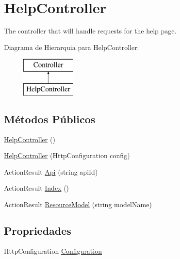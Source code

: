 \hypertarget{classApi3Layers_1_1Areas_1_1HelpPage_1_1Controllers_1_1HelpController}{}\section{Help\+Controller}
\label{classApi3Layers_1_1Areas_1_1HelpPage_1_1Controllers_1_1HelpController}


The controller that will handle requests for the help page.  


Diagrama de Hierarquia para Help\+Controller\+:\begin{figure}[H]
\begin{center}
\leavevmode
\includegraphics[height=2.000000cm]{classApi3Layers_1_1Areas_1_1HelpPage_1_1Controllers_1_1HelpController}
\end{center}
\end{figure}
\subsection*{Métodos Públicos}
\begin{DoxyCompactItemize}
\item 
\hyperlink{classApi3Layers_1_1Areas_1_1HelpPage_1_1Controllers_1_1HelpController_a83181268f5f82b22c63b3f978fa4c32c}{Help\+Controller} ()
\item 
\hyperlink{classApi3Layers_1_1Areas_1_1HelpPage_1_1Controllers_1_1HelpController_a7fb80807bac7887eefc2cf102ad34d7a}{Help\+Controller} (Http\+Configuration config)
\item 
Action\+Result \hyperlink{classApi3Layers_1_1Areas_1_1HelpPage_1_1Controllers_1_1HelpController_a7ab3cc2e28440430c53c8651bee60e72}{Api} (string api\+Id)
\item 
Action\+Result \hyperlink{classApi3Layers_1_1Areas_1_1HelpPage_1_1Controllers_1_1HelpController_a82bdd581a9c68d02c11ac8160aa5d60b}{Index} ()
\item 
Action\+Result \hyperlink{classApi3Layers_1_1Areas_1_1HelpPage_1_1Controllers_1_1HelpController_a6833392bcc6273de228714a6f512c2bc}{Resource\+Model} (string model\+Name)
\end{DoxyCompactItemize}
\subsection*{Propriedades}
\begin{DoxyCompactItemize}
\item 
Http\+Configuration \hyperlink{classApi3Layers_1_1Areas_1_1HelpPage_1_1Controllers_1_1HelpController_aa3cd9c8489aca78a2da59567fc5207ba}{Configuration}
\end{DoxyCompactItemize}
